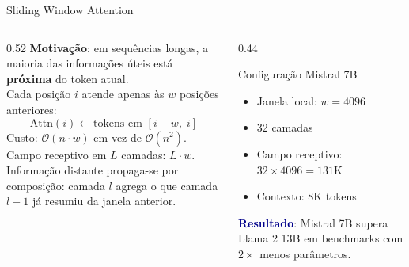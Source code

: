 \documentclass[aspectratio=169, xcolor=dvipsnames]{beamer}
\begin{document}
  \begin{frame}{Sliding Window Attention \cite{jiang2023mistral}}
    \begin{columns}[T]
      \begin{column}{0.52\textwidth}
        \textbf{Motivação}: em sequências longas, a maioria das informações úteis está \textbf{próxima} do token atual.\\[0.4em]
        Cada posição $i$ atende apenas às $w$ posições anteriores:
        \[
          \text{Attn}(i) \leftarrow \text{tokens em } [i-w,\; i]
        \]
        Custo: $\mathcal{O}(n \cdot w)$ em vez de $\mathcal{O}(n^2)$.\\[0.3em]
        Campo receptivo em $L$ camadas: $L \cdot w$.\\
        {\footnotesize Informação distante propaga-se por composição: camada $l$ agrega o que camada $l{-}1$ já resumiu da janela anterior.}
      \end{column}
      \begin{column}{0.44\textwidth}
        \begin{block}{Configuração Mistral 7B}
          \begin{itemize}
            \item Janela local: $w = 4096$
            \item 32 camadas
            \item Campo receptivo: $32 \times 4096 = 131\text{K}$
            \item Contexto: 8K tokens
          \end{itemize}
        \end{block}
        \vspace{0.3em}
        \textcolor{DarkBlue}{\textbf{Resultado}}: Mistral 7B supera Llama 2 13B em benchmarks com $2\times$ menos parâmetros.
      \end{column}
    \end{columns}
  \end{frame}
\end{document}
